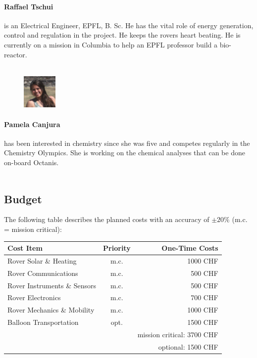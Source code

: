 \documentclass[a4paper,12pt]{article}
\begin{document}
\paragraph{Raffael Tschui} is an Electrical Engineer, EPFL, B. Sc. He has the vital role of energy generation, control and regulation in the project. He keeps the rovers heart beating. He is currently on a mission in Columbia to help an EPFL professor build a bio-reactor.
\\ \\

\begin{figure}
    \centering
    \vspace{-13pt}
    \includegraphics[width=0.15\textwidth]{pam}
\end{figure} 
\paragraph{Pamela Canjura} has been interested in chemistry since she was five and competes regularly in the Chemistry Olympics. She is working on the chemical analyses that can be done on-board Octanis.
\\ \\


\subsection{Budget}

The following table describes the planned costs with an accuracy of $\pm 20\%$ (m.c. = mission critical): \\ 

\begin{table}[h!]
\begin{tabular}{ l | c || r }
  Cost Item & Priority & One-Time Costs \\
  \hline
  Rover Solar \& Heating & m.c. & 1000 CHF \\
  Rover Communications & m.c. & 500 CHF \\
  Rover Instruments \& Sensors & m.c. & 500 CHF \\
  Rover Electronics & m.c. & 700 CHF \\
  Rover Mechanics \& Mobility & m.c. & 1000 CHF \\
  Balloon Transportation & opt. & 1500 CHF \\
  \hline \hline
  & & mission critical: 3700 CHF  \\
  & & optional: 1500 CHF \\
\end{tabular}
\end{table}
\end{document}

